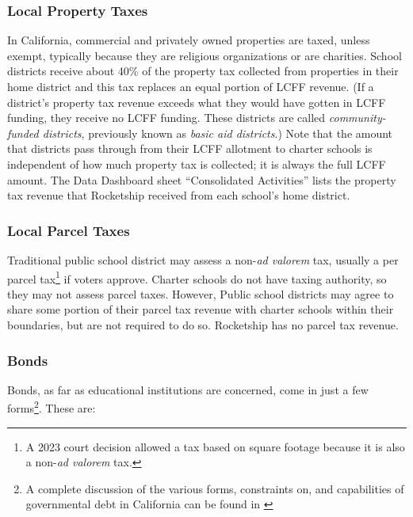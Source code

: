 \subsubsection{Local Property Taxes}%
\label{sec:property-taxes}\indent%

In California, commercial and privately owned properties are taxed, unless exempt, typically because they are religious organizations or are charities. School districts receive about 40\% of the property tax collected from properties in their home district and this tax replaces an equal portion of LCFF revenue. (If a district's property tax revenue exceeds what they would have gotten in LCFF funding, they receive no LCFF funding. These districts are called \textit{community-funded districts}, previously known as \textit{basic aid districts}.) Note that the amount that districts pass through from their LCFF allotment to charter schools is independent of how much property tax is collected; it is always the full LCFF amount. The Data Dashboard sheet ``Consolidated Activities'' lists the property tax revenue that Rocketship received from each school's home district.

\subsubsection{Local Parcel Taxes}%
\label{sec:parcel-taxes}\indent%

Traditional public school district may assess a non-\textit{ad valorem} tax, usually a per parcel tax\footnote{A 2023 court decision allowed a tax based on square footage because it is also a non-\textit{ad valorem} tax.} if voters approve. Charter schools do not have taxing authority, so they may not assess parcel taxes. However, Public school districts may agree to share some portion of their parcel tax revenue with charter schools within their boundaries, but are not required to do so. Rocketship has no parcel tax revenue.

\subsubsection{Bonds}%
\label{sec:bonds}\indent%

Bonds, as far as educational institutions are concerned, come in just a few forms\footnote{A complete discussion of the various forms, constraints on, and capabilities of governmental debt in California can be found in  \parencite{CDIAC2023}}. These are:

